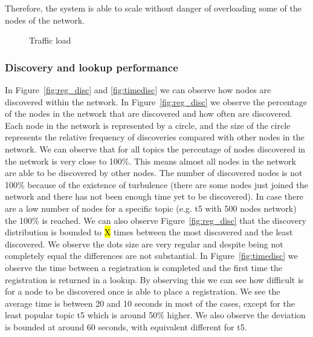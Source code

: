 Therefore, the system is able to scale without danger of overloading some of the nodes of the network.

\begin{figure}[!h]
\centering
{} 
\hspace{-0.25cm}
 \caption{Traffic load} 
\label{fig:traffic}
\vspace{-0.15in}
\end{figure}   

\subsubsection{Discovery and lookup performance}


In Figure~\ref{fig:reg_disc} and \ref{fig:timedisc} we can observe how nodes are discovered within the network.
In Figure~\ref{fig:reg_disc} we observe the percentage of the nodes in the network that are discovered and how often are discovered.
Each node in the network is represented by a circle, and the size of the circle represents the relative frequency of discoveries compared with other nodes in the network.
We can observe that for all topics the percentage of nodes discovered in the network is very close to 100\%. This means almost all nodes in the network are able to be discovered by other nodes. The number of discovered nodes is not 100\% because of the existence of turbulence (there are some nodes just joined the network and there has not been enough time yet to be discovered). In case there are a low number of nodes for a specific topic (e.g. t5 with 500 nodes network) the 100\% is reached.
We can also observe Figure~\ref{fig:reg_disc} that the discovery distribution is bounded to \hl{X} times between the most discovered and the least discovered.
We observe the dots size are very regular and despite being not completely equal the differences are not substantial. 
In Figure~\ref{fig:timedisc} we observe the time between a registration is completed and the first time the registration
is returned in a lookup.
By observing this we can see how difficult is for a node to be discovered once is able to place a registration. 
We see the average time is between 20 and 10 seconds in most of the cases, except for the least popular topic t5 which is around 50\% higher. 
We also observe the deviation is bounded at around 60 seconds, with equivalent different for t5.



